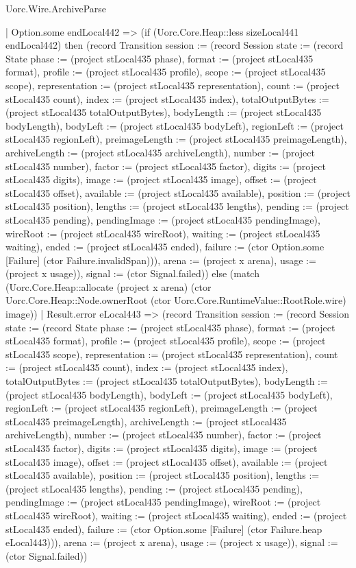 \begin{lexlean}{Uorc.Wire.ArchiveParse}
\begin{semanticmodule}
{            | Option.some endLocal442 => (if (Uorc.Core.Heap::less sizeLocal441 endLocal442) then (record Transition {session := (record Session {state := (record State {phase := (project stLocal435 phase), format := (project stLocal435 format), profile := (project stLocal435 profile), scope := (project stLocal435 scope), representation := (project stLocal435 representation), count := (project stLocal435 count), index := (project stLocal435 index), totalOutputBytes := (project stLocal435 totalOutputBytes), bodyLength := (project stLocal435 bodyLength), bodyLeft := (project stLocal435 bodyLeft), regionLeft := (project stLocal435 regionLeft), preimageLength := (project stLocal435 preimageLength), archiveLength := (project stLocal435 archiveLength), number := (project stLocal435 number), factor := (project stLocal435 factor), digits := (project stLocal435 digits), image := (project stLocal435 image), offset := (project stLocal435 offset), available := (project stLocal435 available), position := (project stLocal435 position), lengths := (project stLocal435 lengths), pending := (project stLocal435 pending), pendingImage := (project stLocal435 pendingImage), wireRoot := (project stLocal435 wireRoot), waiting := (project stLocal435 waiting), ended := (project stLocal435 ended), failure := (ctor Option.some [Failure] (ctor Failure.invalidSpan))}), arena := (project x arena), usage := (project x usage)}), signal := (ctor Signal.failed)}) else (match (Uorc.Core.Heap::allocate (project x arena) (ctor Uorc.Core.Heap::Node.ownerRoot (ctor Uorc.Core.RuntimeValue::RootRole.wire) image))
              | Result.error eLocal443 => (record Transition {session := (record Session {state := (record State {phase := (project stLocal435 phase), format := (project stLocal435 format), profile := (project stLocal435 profile), scope := (project stLocal435 scope), representation := (project stLocal435 representation), count := (project stLocal435 count), index := (project stLocal435 index), totalOutputBytes := (project stLocal435 totalOutputBytes), bodyLength := (project stLocal435 bodyLength), bodyLeft := (project stLocal435 bodyLeft), regionLeft := (project stLocal435 regionLeft), preimageLength := (project stLocal435 preimageLength), archiveLength := (project stLocal435 archiveLength), number := (project stLocal435 number), factor := (project stLocal435 factor), digits := (project stLocal435 digits), image := (project stLocal435 image), offset := (project stLocal435 offset), available := (project stLocal435 available), position := (project stLocal435 position), lengths := (project stLocal435 lengths), pending := (project stLocal435 pending), pendingImage := (project stLocal435 pendingImage), wireRoot := (project stLocal435 wireRoot), waiting := (project stLocal435 waiting), ended := (project stLocal435 ended), failure := (ctor Option.some [Failure] (ctor Failure.heap eLocal443))}), arena := (project x arena), usage := (project x usage)}), signal := (ctor Signal.failed)})
}
\end{semanticmodule}
\end{lexlean}
